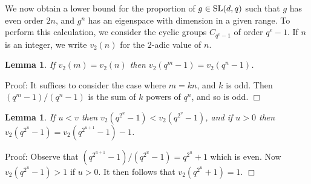\documentclass[12pt]{article}
\newtheorem{lemma}[definition]{Lemma}
\newenvironment{proof}{\normalsize {\sc Proof}:}{{\hfill $\Box$ \\}}
\def\SL{{\rm SL}}
\begin{document}
We now obtain a lower bound for the proportion of 
$g\in\SL(d,q)$ such that $g$ has even order $2n$, and $g^n$
has an eigenspace with dimension in a given range. 
To perform this calculation, we consider the cyclic groups $C_{q^e-1}$ of order
$q^e-1$. If $n$ is an integer, we write $v_2(n)$ for the $2$-adic
value of $n$.

\begin{lemma}\label{Lemma5.6} If $v_2(m)=v_2(n)$ then $v_2(q^m-1) = v_2(q^n-1)$.
\end{lemma}
\begin{proof} 
 It suffices to consider the case where $m=kn$, and $k$ is odd.
Then $(q^m-1)/(q^n-1)$ is the sum of $k$ powers of $q^n$, and so is odd.
\end{proof}

\begin{lemma}\label{Lemma5.7} If $u<v$ then $v_2(q^{2^u}-1)<v_2(q^{2^v}-1)$, 
and if $u>0$ then $v_2(q^{2^u}-1) =v_2(q^{2^{u+1}}-1)-1$.
\end{lemma}
\begin{proof} 
Observe that $(q^{2^{u+1}}-1)/(q^{2^u}-1)=q^{2^u}+1$ which is even. Now
$v_2(q^{2^u}-1)>1$ if $u>0$. It then follows that $v_2(q^{2^u}+1)=1$.
\end{proof}
\end{document}
